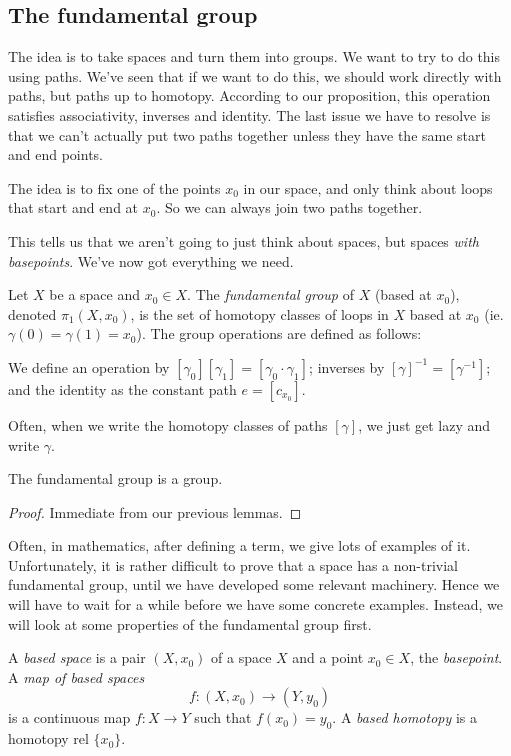 \documentclass[a4paper]{article}
\begin{document}
\subsection{The fundamental group}
The idea is to take spaces and turn them into groups. We want to try to do this using paths. We've seen that if we want to do this, we should work directly with paths, but paths up to homotopy. According to our proposition, this operation satisfies associativity, inverses and identity. The last issue we have to resolve is that we can't actually put two paths together unless they have the same start and end points.

The idea is to fix one of the points $x_0$ in our space, and only think about loops that start and end at $x_0$. So we can always join two paths together.

This tells us that we aren't going to just think about spaces, but spaces \emph{with basepoints}. We've now got everything we need.

\begin{defi}
  Let $X$ be a space and $x_0 \in X$. The \emph{fundamental group} of $X$ (based at $x_0$), denoted $\pi_1(X, x_0)$, is the set of homotopy classes of loops in $X$ based at $x_0$ (ie. $\gamma(0) = \gamma(1) = x_0$). The group operations are defined as follows:

  We define an operation by $[\gamma_0][\gamma_1] = [\gamma_0\cdot \gamma_1]$; inverses by $[\gamma]^{-1} = [\gamma^{-1}]$; and the identity as the constant path $e = [c_{x_0}]$.
\end{defi}
Often, when we write the homotopy classes of paths $[\gamma]$, we just get lazy and write $\gamma$.

\begin{thm}[]
  The fundamental group is a group.
\end{thm}

\begin{proof}
  Immediate from our previous lemmas.
\end{proof}

Often, in mathematics, after defining a term, we give lots of examples of it. Unfortunately, it is rather difficult to prove that a space has a non-trivial fundamental group, until we have developed some relevant machinery. Hence we will have to wait for a while before we have some concrete examples. Instead, we will look at some properties of the fundamental group first.

\begin{defi}
  A \emph{based space} is a pair $(X, x_0)$ of a space $X$ and a point $x_0\in X$, the \emph{basepoint}. A \emph{map of based spaces}
  \[
    f: (X, x_0) \to (Y, y_0)
  \]
  is a continuous map $f: X\to Y$ such that $f(x_0) = y_0$. A \emph{based homotopy} is a homotopy rel $\{x_0\}$.
\end{defi}
\end{document}
